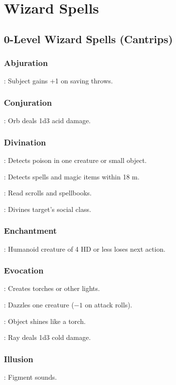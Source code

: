 \section{Wizard Spells}



\subsection{0-Level Wizard Spells (Cantrips)}

\subsubsection{Abjuration}
	: Subject gains +1 on saving throws.

\subsubsection{Conjuration}
	: Orb deals 1d3 acid damage.

\subsubsection{Divination}
	: Detects poison in one creature or small object.

	: Detects spells and magic items within 18 m.

	: Read scrolls and spellbooks.

	: Divines target's social class. %

\subsubsection{Enchantment}
	: Humanoid creature of 4 HD or less loses next action.

\subsubsection{Evocation}
	: Creates torches or other lights.

	: Dazzles one creature ($-1$ on attack rolls).

	: Object shines like a torch.

	: Ray deals 1d3 cold damage.

\subsubsection{Illusion}
	: Figment sounds.

